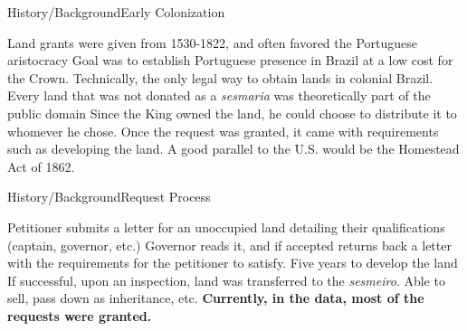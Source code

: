 \documentclass[aspectratio=1610]{beamer}
\begin{document}
\begin{frame}{History/Background}{Early Colonization}
    \begin{outline}
        \1 Land grants were given from 1530-1822, and often favored the Portuguese aristocracy \parencites[p.~16]{Diegues_Junior1959-ba}{Lobb1976-mc}
        \vspace{1mm}
        \pause 
        \1 Goal was to establish Portuguese presence in Brazil at a low cost for the Crown.
        \pause 
        \vspace{-2mm}
        \1 Technically, the only legal way to obtain lands in colonial Brazil.
            \2 Every land that was not donated as a \textit{sesmaria} was theoretically part of the public domain
            \2 Since the King owned the land, he could choose to distribute it to whomever he chose.
        \vspace{1mm}
        \pause 
        \1 Once the request was granted, it came with requirements such as developing the land.
        \vspace{1mm}
            \2 A good parallel to the U.S. would be the Homestead Act of 1862. 
    \end{outline}
\end{frame}

\begin{frame}{History/Background}{Request Process}
    \begin{outline}
        \1 Petitioner submits a letter for an unoccupied land detailing their qualifications (captain, governor, etc.)
        \vspace{1mm}
        \pause 
        \1 Governor reads it, and if accepted returns back a letter with the requirements for the petitioner to satisfy.
        \vspace{1mm}
        \pause 
        \1 Five years to develop the land
        \vspace{1mm}
        \pause 
        \1 If successful, upon an inspection, land was transferred to the \textit{sesmeiro}.
        \vspace{1mm}
        \pause 
        \1 Able to sell, pass down as inheritance, etc. 
        \pause 
        \1 \textbf{Currently, in the data, most of the requests were granted.} 
    \end{outline}
\end{frame}
\end{document}
